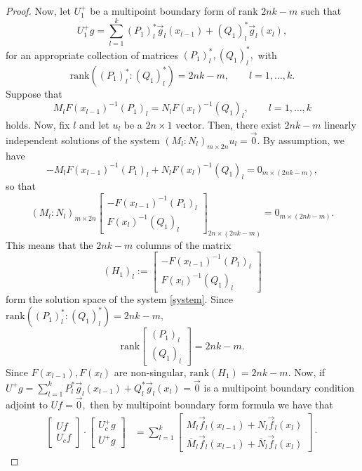 \documentclass[11pt,reqno,oneside,a4paper]{article}
\theoremstyle{plain} %
\theoremstyle{definition}
\theoremstyle{remark}
\begin{document}
\begin{proof}
Now, let $U_1^+$ be a multipoint boundary form of rank $2nk-m$ such that 
\[ 
U_1^+ g = \sum^k_{l=1} (P_1)^*_l \vec{g}_l(x_{l-1}) + (Q_1)^*_l \vec{g}_l(x_l),
\]
for an appropriate collection of matrices $(P_1)^*_l, (Q_1)^*_l,$ with 
\[\mathrm{rank}((P_1)^*_l : (Q_1)^*_l) = 2nk-m, \qquad l = 1,\ldots, k.\]
 Suppose that 
\[ M_l  F(x_{l-1})^{-1} (P_1)_l = N_l F(x_l)^{-1}(Q_1)_l, \qquad l = 1,\ldots, k \]
holds. Now, fix $l$ and let $u_l$ be a $2n\times 1$ vector. Then, there exist $2nk-m$ linearly independent solutions of the system $(M_l : N_l)_{m\times 2n}u_l = \vec{0}.$ By assumption, we have 
\[
-  M_l  F(x_{l-1})^{-1} (P_1)_l + N_l F(x_l)^{-1}(Q_1)_l   =  0_{m\times (2nk-m)},
\]
so that 
\begin{equation}\label{system}
(M_l : N_l)_{m\times 2n} 
\begin{bmatrix}
-F(x_{l-1})^{-1} (P_1)_l \\
F(x_l)^{-1}(Q_1)_l
\end{bmatrix}_{2n\times(2nk-m)} = 0_{m \times(2nk-m)}. 
\end{equation}
This means that the $2nk-m$ columns of the matrix 
\[ (H_1)_l := \begin{bmatrix}
-F(x_{l-1})^{-1} (P_1)_l \\
F(x_l)^{-1}(Q_1)_l
\end{bmatrix}
\]
form the solution space of the system \eqref{system}. Since $\mathrm{rank}((P_1)^*_l : (Q_1)^*_l) = 2nk-m,$
\[ 
\mathrm{rank}
\begin{bmatrix}
(P_1)_l \\
(Q_1)_l
\end{bmatrix}
= 2nk-m.
\] 
Since $F(x_{l-1}), F(x_{l})$ are non-singular, $\mathrm{rank}(H_1) = 2nk - m.$
Now, if $U^+g = \sum^k_{l=1} P^*_l \vec{g}_l(x_{l-1}) + Q^*_l \vec{g}_l(x_l) = \vec{0}$ is a multipoint boundary condition adjoint to $Uf = \vec{0},$ then by multipoint boundary form formula we have that 
\begin{align*}
\begin{bmatrix}
Uf \\
U_c f
\end{bmatrix} \cdot 
\begin{bmatrix}
U^+_cg \\
U^+ g
\end{bmatrix} 
&= 
\sum^k_{l=1} 
\begin{bmatrix}
M_l  \vec{f}_l(x_{l-1}) + N_l \vec{f}_l(x_l) \\
\overline{M}_l \vec{f}_l(x_{l-1}) +\overline{N}_l \vec{f}_l(x_l) 
\end{bmatrix} \cdot 

\end{align*}
\end{proof}
\end{document}
